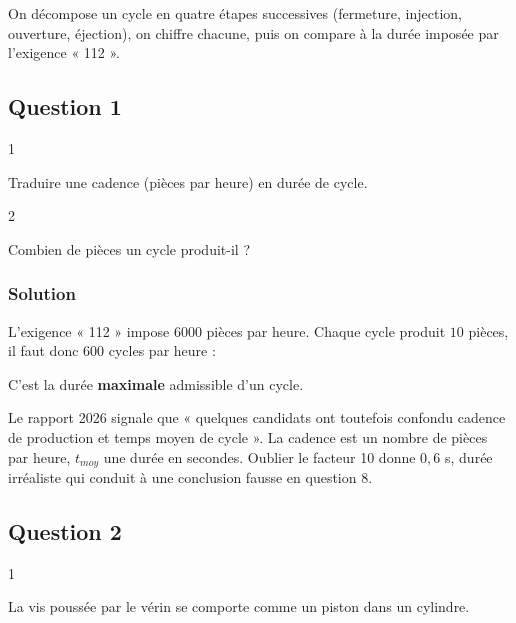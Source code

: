 \documentclass[11pt,a4paper]{article}
\newcommand{\equationajustee}[1]{%
  \sbox{\boiteequation}{$\displaystyle #1$}%
  \ifdim\wd\boiteequation>\linewidth
    \[\resizebox{\linewidth}{!}{\usebox{\boiteequation}}\]%
  \else
    \[#1\]%
  \fi}
\begin{document}
On décompose un cycle en quatre étapes successives (fermeture, injection, ouverture, éjection), on chiffre chacune, puis on compare à la durée imposée par l'exigence « 112 ».

\hypertarget{question-1}{%
\subsection{Question 1}\label{question-1}}

\begin{indication}{1}

Traduire une cadence (pièces par heure) en durée de cycle.

\end{indication}

\begin{indication}{2}

Combien de pièces un cycle produit-il ?

\end{indication}

\hypertarget{solution}{%
\subsubsection{Solution}\label{solution}}

L'exigence « 112 » impose \(6000\) pièces par heure. Chaque cycle produit \(10\) pièces, il faut donc \(600\) cycles par heure :

\equationajustee{\boxed{t_{moy}=\frac{3600}{600}=6{,}0\ \text{s}}}

C'est la durée \textbf{maximale} admissible d'un cycle.

\begin{piege}

Le rapport 2026 signale que « quelques candidats ont toutefois confondu cadence de production et temps moyen de cycle ». La cadence est un nombre de pièces par heure, \(t_{moy}\) une durée en secondes. Oublier le facteur 10 donne \(0{,}6\) s, durée irréaliste qui conduit à une conclusion fausse en question 8.

\end{piege}

\hypertarget{question-2}{%
\subsection{Question 2}\label{question-2}}

\begin{indication}{1}

La vis poussée par le vérin se comporte comme un piston dans un cylindre.

\end{indication}
\end{document}
